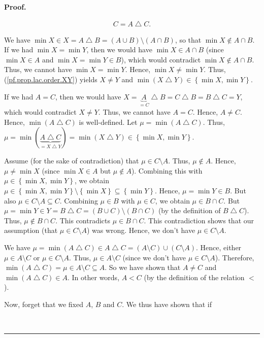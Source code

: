 \documentclass[numbers=enddot,12pt,final,onecolumn,notitlepage]{scrartcl}%
\theoremstyle{definition}
\newenvironment{proof}[1][Proof]{\noindent\textbf{#1.} }{\ \rule{0.5em}{0.5em}}
\newenvironment{verlong}{}{}
\begin{document}
\begin{verlong}
\begin{proof}
{\begin{align*}
C=A\bigtriangleup C.
\end{align*}
\par
We have $\min X\in X=A\bigtriangleup B=\left(  A\cup B\right)  \setminus
\left(  A\cap B\right)  $, so that $\min X\notin A\cap B$. If we had $\min
X=\min Y$, then we would have $\min X\in A\cap B$ (since $\min X\in A$ and
$\min X=\min Y\in B$), which would contradict $\min X\notin A\cap B$. Thus, we
cannot have $\min X=\min Y$. Hence, $\min X\neq\min Y$. Thus,
(\ref{pf.prop.lac.order.XY}) yields $X\neq Y$ and $\min\left(  X\bigtriangleup
Y\right)  \in\left\{  \min X,\min Y\right\}  $.
\par
If we had $A=C$, then we would have $X=\underbrace{A}_{=C}\bigtriangleup
B=C\bigtriangleup B=B\bigtriangleup C=Y$, which would contradict $X\neq Y$.
Thus, we cannot have $A=C$. Hence, $A\neq C$. Hence, $\min\left(
A\bigtriangleup C\right)  $ is well-defined. Let $\mu=\min\left(
A\bigtriangleup C\right)  $. Thus, $\mu=\min\left(
\underbrace{A\bigtriangleup C}_{=X\bigtriangleup Y}\right)  =\min\left(
X\bigtriangleup Y\right)  \in\left\{  \min X,\min Y\right\}  $.
\par
Assume (for the sake of contradiction) that $\mu\in C\setminus A$. Thus,
$\mu\notin A$. Hence, $\mu\neq\min X$ (since $\min X\in A$ but $\mu\notin A$).
Combining this with $\mu\in\left\{  \min X,\min Y\right\}  $, we obtain
$\mu\in\left\{  \min X,\min Y\right\}  \setminus\left\{  \min X\right\}
\subseteq\left\{  \min Y\right\}  $. Hence, $\mu=\min Y\in B$. But also
$\mu\in C\setminus A\subseteq C$. Combining $\mu\in B$ with $\mu\in C$, we
obtain $\mu\in B\cap C$. But $\mu=\min Y\in Y=B\bigtriangleup C=\left(  B\cup
C\right)  \setminus\left(  B\cap C\right)  $ (by the definition of
$B\bigtriangleup C$). Thus, $\mu\notin B\cap C$. This contradicts $\mu\in
B\cap C$. This contradiction shows that our assumption (that $\mu\in
C\setminus A$) was wrong. Hence, we don't have $\mu\in C\setminus A$.
\par
We have $\mu=\min\left(  A\bigtriangleup C\right)  \in A\bigtriangleup
C=\left(  A\setminus C\right)  \cup\left(  C\setminus A\right)  $. Hence,
either $\mu\in A\setminus C$ or $\mu\in C\setminus A$. Thus, $\mu\in
A\setminus C$ (since we don't have $\mu\in C\setminus A$). Therefore,
$\min\left(  A\bigtriangleup C\right)  =\mu\in A\setminus C\subseteq A$. So we
have shown that $A\neq C$ and $\min\left(  A\bigtriangleup C\right)  \in A$.
In other words, $A<C$ (by the definition of the relation $<$).
\par
Now, forget that we fixed $A$, $B$ and $C$. We thus have shown that if
}
\end{proof}
\end{verlong}
\end{document}
